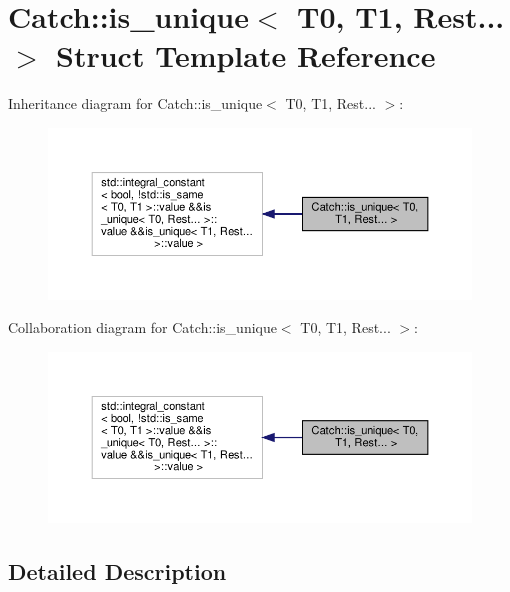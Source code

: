 \hypertarget{structCatch_1_1is__unique_3_01T0_00_01T1_00_01Rest_8_8_8_01_4}{}\section{Catch\+::is\+\_\+unique$<$ T0, T1, Rest... $>$ Struct Template Reference}
\label{structCatch_1_1is__unique_3_01T0_00_01T1_00_01Rest_8_8_8_01_4}


Inheritance diagram for Catch\+::is\+\_\+unique$<$ T0, T1, Rest... $>$\+:
\nopagebreak
\begin{figure}[H]
\begin{center}
\leavevmode
\includegraphics[width=350pt]{structCatch_1_1is__unique_3_01T0_00_01T1_00_01Rest_8_8_8_01_4__inherit__graph}
\end{center}
\end{figure}


Collaboration diagram for Catch\+::is\+\_\+unique$<$ T0, T1, Rest... $>$\+:
\nopagebreak
\begin{figure}[H]
\begin{center}
\leavevmode
\includegraphics[width=350pt]{structCatch_1_1is__unique_3_01T0_00_01T1_00_01Rest_8_8_8_01_4__coll__graph}
\end{center}
\end{figure}


\subsection{Detailed Description}
